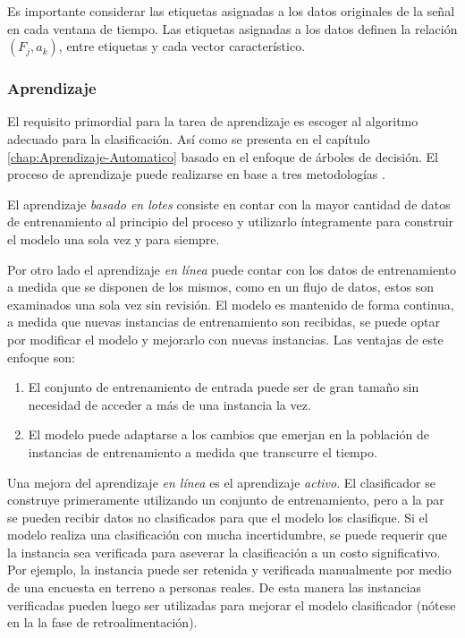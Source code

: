 Es importante considerar las etiquetas asignadas a los datos originales
de la señal en cada ventana de tiempo. Las etiquetas asignadas a los
datos definen la relación $(F_{j},a_{k})$, entre etiquetas y cada
vector característico. 

\subsubsection{Aprendizaje}

El requisito primordial para la tarea de aprendizaje es escoger al
algoritmo adecuado para la clasificación. Así como se presenta en
el capítulo \ref{chap:Aprendizaje-Automatico} basado en el enfoque
de árboles de decisión. El proceso de aprendizaje puede realizarse
en base a tres metodologías \cite{Rajaraman2011}.

El aprendizaje \emph{basado en lotes} consiste en contar con la mayor
cantidad de datos de entrenamiento al principio del proceso y utilizarlo
íntegramente para construir el modelo una sola vez y para siempre. 

Por otro lado el aprendizaje \emph{en línea} puede contar con los
datos de entrenamiento a medida que se disponen de los mismos, como
en un flujo de datos, estos son examinados una sola vez sin revisión.
El modelo es mantenido de forma continua, a medida que nuevas instancias
de entrenamiento son recibidas, se puede optar por modificar el modelo
y mejorarlo con nuevas instancias. Las ventajas de este enfoque son: 
\begin{enumerate}
\item El conjunto de entrenamiento de entrada puede ser de gran tamaño sin
necesidad de acceder a más de una instancia la vez. 
\item El modelo puede adaptarse a los cambios que emerjan en la población
de instancias de entrenamiento a medida que transcurre el tiempo.
\end{enumerate}
Una mejora del aprendizaje \emph{en línea} es el aprendizaje \emph{activo}.
El clasificador se construye primeramente utilizando un conjunto de
entrenamiento, pero a la par se pueden recibir datos no clasificados
para que el modelo los clasifique. Si el modelo realiza una clasificación
con mucha incertidumbre, se puede requerir que la instancia sea verificada
para aseverar la clasificación a un costo significativo. Por ejemplo,
la instancia puede ser retenida y verificada manualmente por medio
de una encuesta en terreno a personas reales. De esta manera las instancias
verificadas pueden luego ser utilizadas para mejorar el modelo clasificador
(nótese en la  la fase de retroalimentación). 

